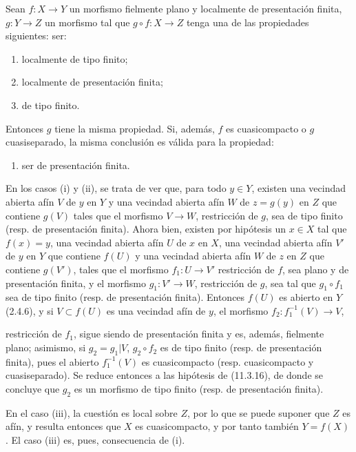 \begin{lemma}[17.7.5]
\label{IV.17.7.5}
Sean $f:X\to Y$ un morfismo fielmente plano y localmente de presentación finita, $g:Y\to Z$ un morfismo tal que $g\circ f:X\to Z$ tenga una de las propiedades siguientes: ser:
\begin{enumerate}
  \item[\textup{(i)}] localmente de tipo finito;
  \item[\textup{(ii)}] localmente de presentación finita;
  \item[\textup{(iii)}] de tipo finito.
\end{enumerate}
Entonces $g$ tiene la misma propiedad. Si, además, $f$ es cuasicompacto o $g$ cuasiseparado, la misma conclusión es válida para la propiedad:
\begin{enumerate}
  \item[\textup{(iv)}] ser de presentación finita.
\end{enumerate}
\end{lemma}

En los casos (i) y (ii), se trata de ver que, para todo $y\in Y$, existen una vecindad abierta afín $V$ de $y$ en $Y$ y una vecindad abierta afín $W$ de $z=g(y)$ en $Z$ que contiene $g(V)$ tales que el morfismo $V\to W$, restricción de $g$, sea de tipo finito (resp. de presentación finita). Ahora bien, existen por hipótesis un $x\in X$ tal que $f(x)=y$, una vecindad abierta afín $U$ de $x$ en $X$, una vecindad abierta afín $V'$ de $y$ en $Y$ que contiene $f(U)$ y una vecindad abierta afín $W$ de $z$ en $Z$ que contiene $g(V')$, tales que el morfismo $f_1:U\to V'$ restricción de $f$, sea plano y de presentación finita, y el morfismo $g_1:V'\to W$, restricción de $g$, sea tal que $g_1\circ f_1$ sea de tipo finito (resp. de presentación finita). Entonces $f(U)$ es abierto en $Y$ (2.4.6), y si $V\subset f(U)$ es una vecindad afín de $y$, el morfismo $f_2:f_1^{-1}(V)\to V$,


restricción de $f_1$, sigue siendo de presentación finita y es, además, fielmente plano; asimismo, si $g_2=g_1|V$, $g_2\circ f_2$ es de tipo finito (resp. de presentación finita), pues el abierto $f_1^{-1}(V)$ es cuasicompacto (resp. cuasicompacto y cuasiseparado). Se reduce entonces a las hipótesis de (11.3.16), de donde se concluye que $g_2$ es un morfismo de tipo finito (resp. de presentación finita).

En el caso (iii), la cuestión es local sobre $Z$, por lo que se puede suponer que $Z$ es afín, y resulta entonces que $X$ es cuasicompacto, y por tanto también $Y=f(X)$. El caso (iii) es, pues, consecuencia de (i).

